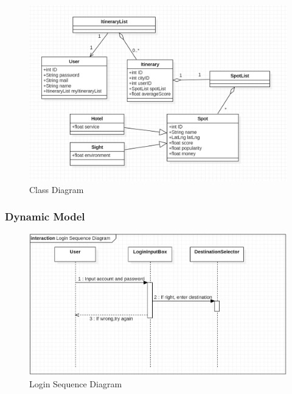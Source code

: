 \documentclass[10pt]{article}
\begin{document}
\begin{figure}[H]
	\centering
	\includegraphics[width=14cm]{class.png} 
	\caption{Class Diagram}
	\label{Class Diagram}
\end{figure}

\subsubsection{Dynamic Model}
\begin{figure}[H]
	\centering
	\includegraphics[width=14cm]{login.jpg} 
	\caption{Login Sequence Diagram}
	\label{Login Sequence Diagram}
\end{figure}
\end{document}
